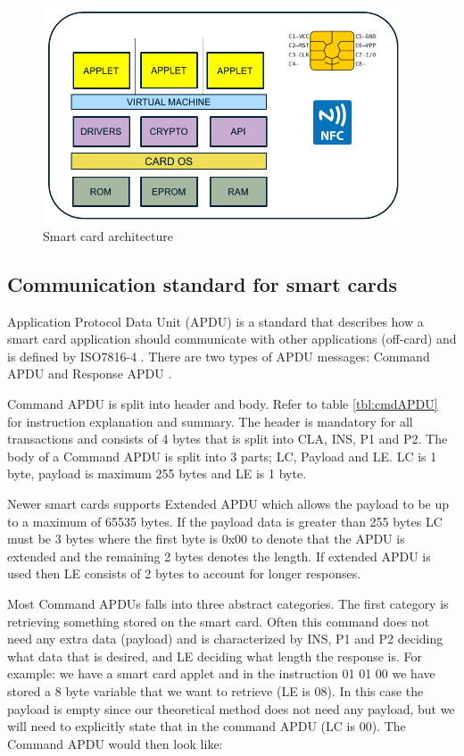 \begin{figure}[h!]
  \caption{Smart card architecture}
  \label{fig:smartcardArchitecture}
  \centering
    \includegraphics[width=0.95\textwidth]{images/javacardArchitecture.png}
\end{figure}

\subsection{Communication standard for smart cards}
\label{sec:communicationstandard}
Application Protocol Data Unit (APDU) is a standard that describes how a smart card application should communicate with other applications (off-card) and is defined by ISO7816-4 \cite{iso7816-4}. There are two types of APDU messages: Command APDU and Response APDU \cite[~Ch. 8.3, Message Structure: APDUS]{smartcardHandbook}.

Command APDU is split into header and body. Refer to table \ref{tbl:cmdAPDU} for instruction explanation and summary. The header is mandatory for all transactions and consists of 4 bytes that is split into CLA, INS, P1 and P2. The body of a Command APDU is split into 3 parts; LC, Payload and LE. LC is 1 byte, payload is maximum 255 bytes and LE is 1 byte.

Newer smart cards supports Extended APDU which allows the payload to be up to a maximum of 65535 bytes. If the payload data is greater than 255 bytes LC must be 3 bytes where the first byte is 0x00 to denote that the APDU is extended and the remaining 2 bytes denotes the length. If extended APDU is used then LE consists of 2 bytes to account for longer responses.


Most Command APDUs falls into three abstract categories. The first category is retrieving something stored on the smart card. Often this command does not need any extra data (payload) and is characterized by INS, P1 and P2 deciding what data that is desired, and LE deciding what length the response is. For example: we have a smart card applet and in the instruction 01 01 00 we have stored a 8 byte variable that we want to retrieve (LE is 08). In this case the payload is empty since our theoretical method does not need any payload, but we will need to explicitly state that in the command APDU (LC is 00). The Command APDU would then look like:

